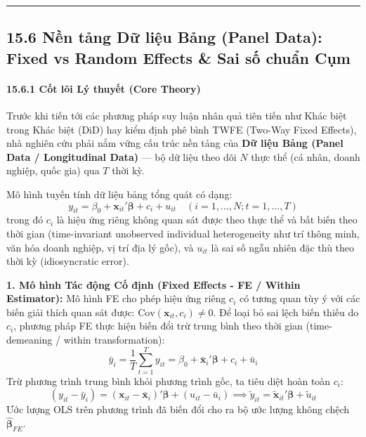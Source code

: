 \documentclass[
]{article}
\begin{document}
\begin{center}\rule{0.5\linewidth}{0.5pt}\end{center}

\subsection{15.6 Nền tảng Dữ liệu Bảng (Panel Data): Fixed vs Random
Effects \& Sai số chuẩn
Cụm}\label{nux1ec1n-tux1ea3ng-dux1eef-liux1ec7u-bux1ea3ng-panel-data-fixed-vs-random-effects-sai-sux1ed1-chuux1ea9n-cux1ee5m}

\paragraph{15.6.1 Cốt lõi Lý thuyết (Core
Theory)}\label{cux1ed1t-luxf5i-luxfd-thuyux1ebft-core-theory-51}

Trước khi tiến tới các phương pháp suy luận nhân quả tiên tiến như Khác
biệt trong Khác biệt (DiD) hay kiểm định phê bình TWFE (Two-Way Fixed
Effects), nhà nghiên cứu phải nắm vững cấu trúc nền tảng của \textbf{Dữ
liệu Bảng (Panel Data / Longitudinal Data)} --- bộ dữ liệu theo dõi
\(N\) thực thể (cá nhân, doanh nghiệp, quốc gia) qua \(T\) thời kỳ.

Mô hình tuyến tính dữ liệu bảng tổng quát có dạng:
\[y_{it} = \beta_0 + \mathbf{x}_{it}'\boldsymbol{\beta} + c_i + u_{it} \quad (i = 1, \dots, N; t = 1, \dots, T)\]
trong đó \(c_i\) là hiệu ứng riêng không quan sát được theo thực thể và
bất biến theo thời gian (time-invariant unobserved individual
heterogeneity như trí thông minh, văn hóa doanh nghiệp, vị trí địa lý
gốc), và \(u_{it}\) là sai số ngẫu nhiên đặc thù theo thời kỳ
(idiosyncratic error).

\textbf{1. Mô hình Tác động Cố định (Fixed Effects - FE / Within
Estimator):} Mô hình FE cho phép hiệu ứng riêng \(c_i\) có tương quan
tùy ý với các biến giải thích quan sát được:
\(\text{Cov}(\mathbf{x}_{it}, c_i) \neq 0\). Để loại bỏ sai lệch biến
thiếu do \(c_i\), phương pháp FE thực hiện biến đổi trừ trung bình theo
thời gian (time-demeaning / within transformation):
\[\bar{y}_i = \frac{1}{T} \sum_{t=1}^T y_{it} = \beta_0 + \bar{\mathbf{x}}_i'\boldsymbol{\beta} + c_i + \bar{u}_i\]
Trừ phương trình trung bình khỏi phương trình gốc, ta tiêu diệt hoàn
toàn \(c_i\):
\[(y_{it} - \bar{y}_i) = (\mathbf{x}_{it} - \bar{\mathbf{x}}_i)'\boldsymbol{\beta} + (u_{it} - \bar{u}_i) \implies \tilde{y}_{it} = \tilde{\mathbf{x}}_{it}'\boldsymbol{\beta} + \tilde{u}_{it}\]
Ước lượng OLS trên phương trình đã biến đổi cho ra bộ ước lượng không
chệch \(\hat{\boldsymbol{\beta}}_{FE}\).
\end{document}
